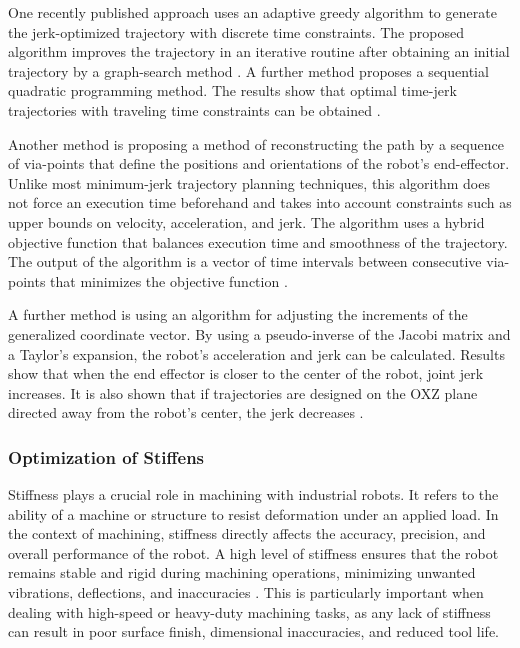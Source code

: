  
One recently published approach uses an adaptive greedy algorithm to generate the jerk-optimized trajectory with discrete time constraints. The proposed algorithm improves the trajectory in an iterative routine after obtaining an initial trajectory by a graph-search method \cite{Dai.2020}.
A further method proposes a sequential quadratic programming method. The results show that optimal time-jerk trajectories with traveling time constraints can be obtained \cite{Jiang.2017}. 
 
Another method is proposing a method of reconstructing the path by a sequence of via-points that define the positions and orientations of the robot's end-effector. Unlike most minimum-jerk trajectory planning techniques, this algorithm does not force an execution time beforehand and takes into account constraints such as upper bounds on velocity, acceleration, and jerk. The algorithm uses a hybrid objective function that balances execution time and smoothness of the trajectory. The output of the algorithm is a vector of time intervals between consecutive via-points that minimizes the objective function \cite{Gasparetto.2010}. 


A further method is using an algorithm for adjusting the increments of the generalized coordinate vector. By using a pseudo-inverse of the Jacobi matrix and a Taylor’s expansion, the robot's acceleration and jerk can be calculated. Results show that when the end effector is closer to the center of the robot, joint jerk increases. It is also shown that if trajectories are designed on the OXZ plane directed away from the robot's center, the jerk decreases \cite{Duong.2021}.

\subsubsection{Optimization of Stiffens}
Stiffness plays a crucial role in machining with industrial robots. It refers to the ability of a machine or structure to resist deformation under an applied load. In the context of machining, stiffness directly affects the accuracy, precision, and overall performance of the robot. A high level of stiffness ensures that the robot remains stable and rigid during machining operations, minimizing unwanted vibrations, deflections, and inaccuracies \cite{Wu.2022}. This is particularly important when dealing with high-speed or heavy-duty machining tasks, as any lack of stiffness can result in poor surface finish, dimensional inaccuracies, and reduced tool life. 


